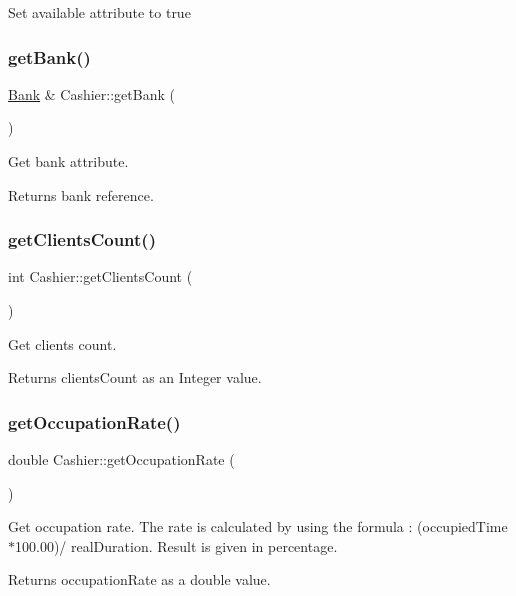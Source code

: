 Set available attribute to true \mbox{\label{classCashier_aa60d8270fa27302302b80a810c53a8f9}} 
\subsubsection{\texorpdfstring{get\+Bank()}{getBank()}}
{\footnotesize\ttfamily \hyperlink{classBank}{Bank} \& Cashier\+::get\+Bank (\begin{DoxyParamCaption}{ }\end{DoxyParamCaption})}

Get bank attribute. \begin{DoxyReturn}{Returns}
bank reference. 
\end{DoxyReturn}
\mbox{\label{classCashier_a50d3d5779132b3806958d0e57aea7a34}} 
\subsubsection{\texorpdfstring{get\+Clients\+Count()}{getClientsCount()}}
{\footnotesize\ttfamily int Cashier\+::get\+Clients\+Count (\begin{DoxyParamCaption}{ }\end{DoxyParamCaption})}

Get clients count. \begin{DoxyReturn}{Returns}
clients\+Count as an Integer value. 
\end{DoxyReturn}
\mbox{\label{classCashier_ac0c91ebe2a9ca9428537e79b82bfbe9f}} 
\subsubsection{\texorpdfstring{get\+Occupation\+Rate()}{getOccupationRate()}}
{\footnotesize\ttfamily double Cashier\+::get\+Occupation\+Rate (\begin{DoxyParamCaption}{ }\end{DoxyParamCaption})}

Get occupation rate. The rate is calculated by using the formula \+: (occupied\+Time$\ast$100.00)/ real\+Duration. Result is given in percentage. \begin{DoxyReturn}{Returns}
occupation\+Rate as a double value. 
\end{DoxyReturn}
\mbox{\label{classCashier_a1123f41f1643d9cce2e502243b2aa5b3}} 
